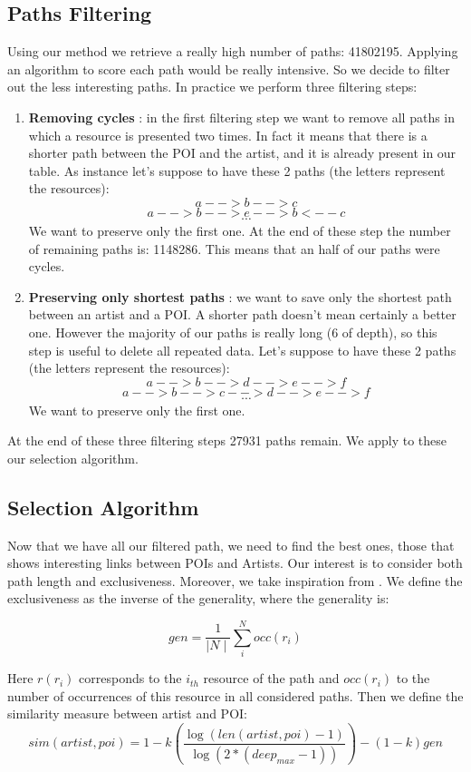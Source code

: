 \documentclass[paper=a4, fontsize=11pt]{scrartcl}
\begin{document}
\subsection{Paths Filtering}
Using our method we retrieve a really high number of paths: 41802195. Applying an algorithm to score each path would be really intensive. So we decide to filter out the less interesting paths.
In practice we perform three filtering steps:
\begin{enumerate}
\item \textbf{Removing cycles} : in the  first filtering step we want to remove all paths in which a resource is presented two times. In fact it means that there is a shorter path between the POI and the artist, and it is already present in our table. As instance let's suppose to have these 2 paths (the letters represent the resources):
$$a-->b-->c$$
$$a-->b-->e-->b<--c$$
$$\cdots$$
We want to preserve only the first one. At the end of these step the number of remaining paths is: 1148286. This means that an half of our paths were cycles.

\item \textbf{Preserving only shortest paths} :  we want to save only the shortest path between an artist and a POI. A shorter path doesn't mean certainly a better one. However the majority of our paths is really long (6 of depth), so this step is useful to delete all repeated data. Let's suppose to have these 2 paths (the letters represent the resources):
$$a-->b-->d-->e-->f$$
$$a-->b-->c-->d-->e-->f$$
$$\cdots$$
We want to preserve only the first one.

\end{enumerate}

At the end of these three filtering steps 27931 paths remain. We apply to these our selection algorithm.

\subsection{Selection Algorithm}
Now that we have all our filtered path, we need to find the best ones, those that shows interesting links between POIs and Artists. Our interest is to consider both path length and exclusiveness.
Moreover, we take inspiration from \cite{meng2013review}.
We define the exclusiveness as the inverse of the generality, where the generality is:

$$gen =\frac{1}{\mid N \mid}\sum_i^Nocc(r_{i})$$

Here $r(r_{i})$ corresponds to the $i_{th}$ resource of the path and $occ(r_{i})$ to the number of occurrences of this resource in all considered paths.
Then we define the similarity measure between artist and POI:
$$sim(artist,poi) = 1-k(\frac{\log(len(artist,poi)-1)}{\log(2*(deep_{max} -1))})-(1-k)gen$$
\end{document}
